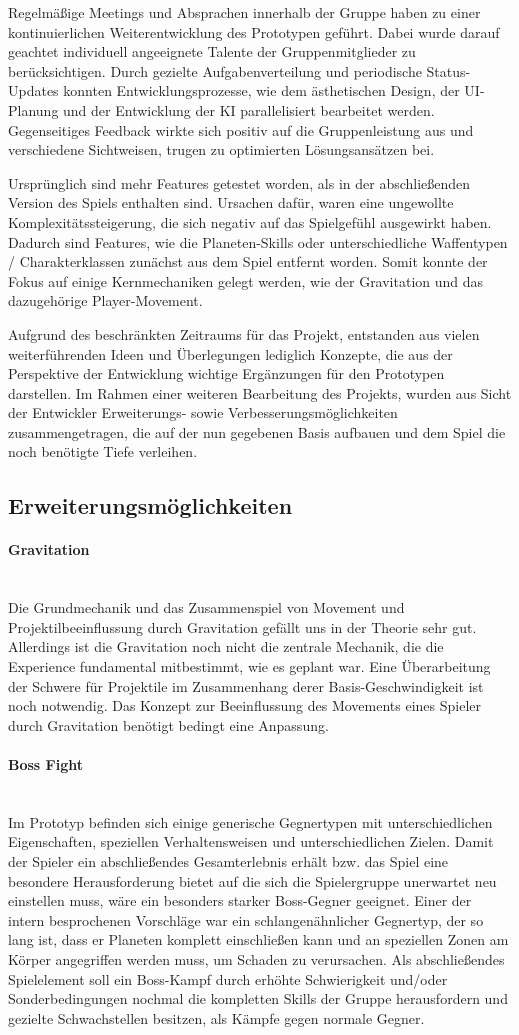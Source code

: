 \documentclass[11pt]{scrartcl}
\newcommand{\lbparagraph}[1]{\paragraph*{#1}\mbox{}\\}
\begin{document}
Regelmäßige Meetings und Absprachen innerhalb der Gruppe haben zu einer kontinuierlichen
Weiterentwicklung des Prototypen geführt. Dabei wurde darauf geachtet individuell
angeeignete Talente der Gruppenmitglieder zu berücksichtigen. Durch gezielte
Aufgabenverteilung und periodische Status-Updates konnten Entwicklungsprozesse, wie dem
ästhetischen Design, der UI-Planung und der Entwicklung der KI parallelisiert bearbeitet
werden. Gegenseitiges Feedback wirkte sich positiv auf die Gruppenleistung aus und
verschiedene Sichtweisen, trugen zu optimierten Lösungsansätzen bei.

Ursprünglich sind mehr Features getestet worden, als in der abschließenden Version des
Spiels enthalten sind. Ursachen dafür, waren eine ungewollte Komplexitäts\-stei\-ge\-rung,
die sich negativ auf das Spielgefühl ausgewirkt haben. Dadurch sind Features, wie die
Planeten-Skills oder unterschiedliche Waffentypen / Charakterklassen zunächst aus dem
Spiel entfernt worden. Somit konnte der Fokus auf einige Kernmechaniken gelegt werden, wie
der Gravitation und das dazugehörige Player-Movement.

Aufgrund des beschränkten Zeitraums für das Projekt, entstanden aus vielen weiterführenden
Ideen und Überlegungen lediglich Konzepte, die aus der Perspektive der Entwicklung
wichtige Ergänzungen für den Prototypen darstellen. Im Rahmen einer weiteren Bearbeitung
des Projekts, wurden aus Sicht der Entwickler Erweiterungs- sowie
Verbesserungsmöglichkeiten zusammengetragen, die auf der nun gegebenen Basis aufbauen und
dem Spiel die noch benötigte Tiefe verleihen.

\subsection{Erweiterungsmöglichkeiten}
\label{subsec:improvements}

\lbparagraph{Gravitation}
Die Grundmechanik und das Zusammenspiel von Movement und Projektilbeeinflussung durch
Gravitation gefällt uns in der Theorie sehr gut. Allerdings ist die Gravitation noch nicht
die zentrale Mechanik, die die Experience fundamental mitbestimmt, wie es geplant war.
Eine Überarbeitung der Schwere für Projektile im Zusammenhang derer Basis-Geschwindigkeit
ist noch notwendig. Das Konzept zur Beeinflussung des Movements eines Spieler durch
Gravitation benötigt bedingt eine Anpassung.

\lbparagraph{Boss Fight}
Im Prototyp befinden sich einige generische Gegnertypen mit unterschiedlichen Eigenschaften,
speziellen Verhaltensweisen und unterschiedlichen Zielen. Damit der Spieler ein abschließendes
Gesamterlebnis erhält bzw. das Spiel eine besondere Herausforderung bietet auf die sich die Spielergruppe
unerwartet neu einstellen muss, wäre ein besonders starker Boss-Gegner geeignet. Einer der intern besprochenen
Vorschläge war ein schlangenähnlicher Gegnertyp, der so lang ist, dass er Planeten komplett einschließen kann und an
speziellen Zonen am Körper angegriffen werden muss, um Schaden zu verursachen. Als abschließendes Spielelement soll ein
Boss-Kampf durch erhöhte Schwierigkeit und/oder Sonderbedingungen nochmal die kompletten Skills der Gruppe herausfordern und
gezielte Schwachstellen besitzen, als Kämpfe gegen normale Gegner.
\end{document}
